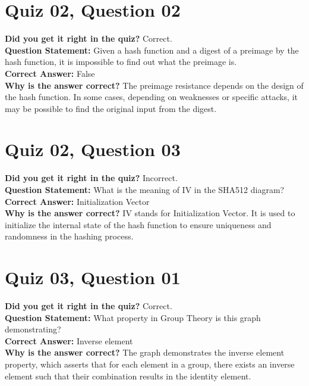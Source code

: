 \documentclass{article}
\begin{document}
\vspace{1em}

\section*{Quiz 02, Question 02} 
\textbf{Did you get it right in the quiz?} Correct. \\
\textbf{Question Statement:} Given a hash function and a digest of a preimage by the hash function, it is impossible to find out what the preimage is. \\
\textbf{Correct Answer:} False \\
\textbf{Why is the answer correct?} The preimage resistance depends on the design of the hash function. In some cases, depending on weaknesses or specific attacks, it may be possible to find the original input from the digest.

\vspace{1em}

\section*{Quiz 02, Question 03} 
\textbf{Did you get it right in the quiz?} Incorrect. \\
\textbf{Question Statement:} What is the meaning of IV in the SHA512 diagram? \\
\textbf{Correct Answer:} Initialization Vector \\
\textbf{Why is the answer correct?} IV stands for Initialization Vector. It is used to initialize the internal state of the hash function to ensure uniqueness and randomness in the hashing process.

\vspace{12em}

\section*{Quiz 03, Question 01}
\textbf{Did you get it right in the quiz?} Correct. \\
\textbf{Question Statement:} What property in Group Theory is this graph demonstrating? \\
\textbf{Correct Answer:} Inverse element \\
\textbf{Why is the answer correct?} The graph demonstrates the inverse element property, which asserts that for each element in a group, there exists an inverse element such that their combination results in the identity element.
\end{document}
